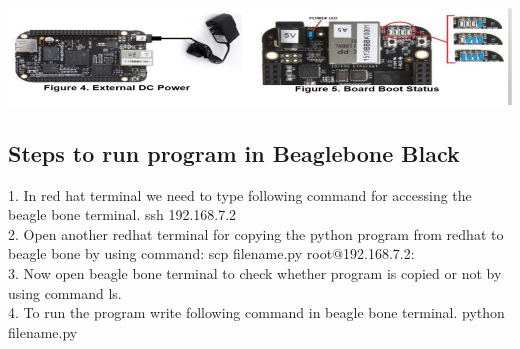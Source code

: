 \documentclass[10pt,a4paper]{article}
\begin{document}
	\includegraphics[width=\textwidth]{bbb_02}
	
\subsection{Steps to run program in Beaglebone Black}
	1.	In red hat terminal we need to type following command for accessing the beagle bone terminal. 
	ssh 192.168.7.2 \\
	2.	Open another redhat terminal for copying the python program from redhat to beagle bone by using command: 
	scp filename.py root@192.168.7.2: \\
	3.	Now open beagle bone terminal to check whether program is copied or not by using command ls. \\
	4.	To run the program write following command in beagle bone terminal. 
	python filename.py \\

\newpage
\end{document}
